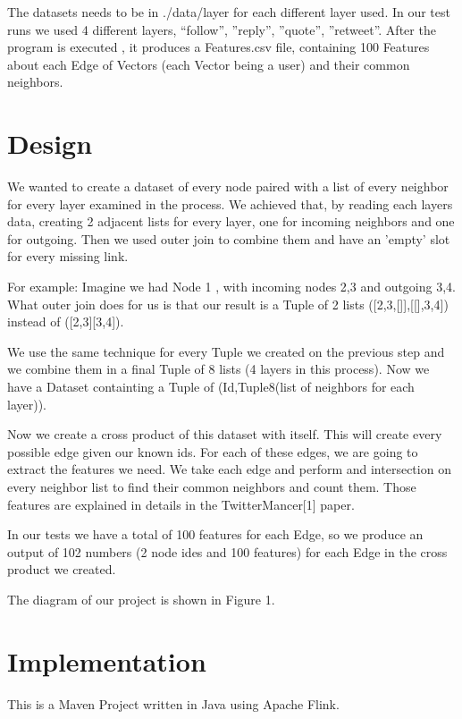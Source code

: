 The datasets needs to be in ./data/{layer} for each different layer used. \newline 
In our test runs we used 4 different layers, “follow”, ”reply”, ”quote”, ”retweet”.
After the program is executed , it produces a Features.csv file, containing 100 Features about each Edge of Vectors (each Vector being a user) and their common neighbors. 




\section{Design}
We wanted to create a dataset of every node paired with a list of every neighbor for every layer examined in the process. We achieved that, by reading each layers data, creating 2 adjacent lists for every layer, one for incoming neighbors and one for outgoing. Then we used outer join to combine them and have an 'empty' slot for every missing link.

For example: Imagine we had Node 1 , with incoming nodes 2,3 and outgoing 3,4. What outer join does for us is that our result is a Tuple of 2 lists ([2,3,[]],[[],3,4]) instead of ([2,3][3,4]).

We use the same technique for every Tuple we created on the previous step and we combine them in a final Tuple of 8 lists (4 layers in this process).  Now we have a Dataset containting a Tuple of (Id,Tuple8(list of neighbors for each layer)). 

Now we create a cross product of this dataset with itself. This will create every possible edge given our known ids. For each of these edges, we are going to extract the features we need. We take each edge and perform and intersection on every neighbor list to find their common neighbors and count them. Those features are explained in details in the TwitterMancer[1] paper. 

In our tests we have a total of 100 features for each Edge, so we produce an output of 102 numbers (2 node ides and 100 features) for each Edge in the cross product we created.


The diagram of our project is shown in Figure 1.


\section{Implementation}

This is a Maven Project written in Java using Apache Flink. 

